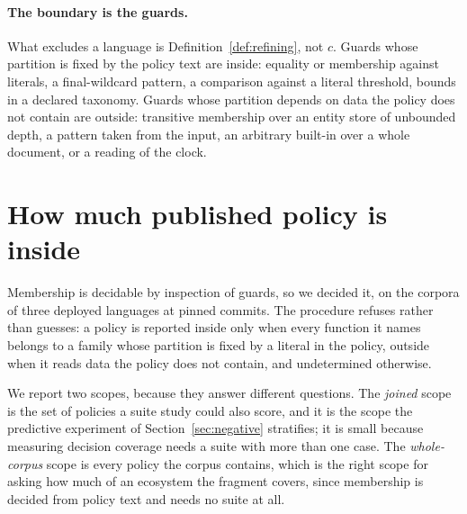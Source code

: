 \documentclass[11pt,a4paper]{article}
\theoremstyle{plain}
\theoremstyle{definition}
\theoremstyle{remark}
\begin{document}
\paragraph{The boundary is the guards.} What excludes a language is
Definition~\ref{def:refining}, not $c$. Guards whose partition is fixed by the policy text
are inside: equality or membership against literals, a final-wildcard pattern, a comparison
against a literal threshold, bounds in a declared taxonomy. Guards whose partition depends
on data the policy does not contain are outside: transitive membership over an entity store
of unbounded depth, a pattern taken from the input, an arbitrary built-in over a whole
document, or a reading of the clock.

\section{How much published policy is inside}
\label{sec:membership}

Membership is decidable by inspection of guards, so we decided it, on the corpora of three
deployed languages at pinned commits. The procedure refuses rather than guesses: a policy is
reported inside only when every function it names belongs to a family whose partition is
fixed by a literal in the policy, outside when it reads data the policy does not contain,
and undetermined otherwise.

We report two scopes, because they answer different questions. The \emph{joined} scope is
the set of policies a suite study could also score, and it is the scope the predictive
experiment of Section~\ref{sec:negative} stratifies; it is small because measuring decision
coverage needs a suite with more than one case. The \emph{whole-corpus} scope is every
policy the corpus contains, which is the right scope for asking how much of an ecosystem the
fragment covers, since membership is decided from policy text and needs no suite at all.
\end{document}
